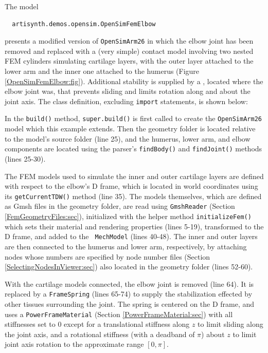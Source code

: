 The model 
\begin{verbatim}
  artisynth.demos.opensim.OpenSimFemElbow
\end{verbatim}
presents a modified version of {\tt OpenSimArm26} in which the elbow joint has
been removed and replaced with a (very simple) contact model involving two
nested FEM cylinders simulating cartilage layers, with the outer layer
attached to the lower arm and the inner one attached to the humerus (Figure
\ref{OpenSimFemElbow:fig}). Additional stability is supplied by a
, located where the elbow joint was, that
prevents sliding and limits rotation along and about the joint axis. The class
definition, excluding {\tt import} statements, is shown below:
%
\lstset{numbers=left} 
\iflatexml

\else

\fi
\lstset{numbers=none}
In the {\tt build()} method, {\tt super.build()} is first called to create the
{\tt OpenSimArm26} model which this example extends. Then the geometry folder is
located relative to the model's source folder (line 25), and the humerus, lower
arm, and elbow components are located using the parser's {\tt findBody()} and
{\tt findJoint()} methods (lines 25-30).

The FEM models used to simulate the inner and outer cartilage layers are
defined with respect to the elbow's D frame, which is located in world
coordinates using its {\tt getCurrentTDW()} method (line 35).  The models
themselves, which are defined as Gmsh files in the geometry folder, are read
using {\tt GmshReader} (Section \ref{FemGeometryFiles:sec}), initialized with
the helper method {\tt initializeFem()} which sets their material and rendering
properties (lines 5-19), transformed to the D frame, and added to the {\tt
MechModel} (lines 40-48). The inner and outer layers are then connected to the
humerus and lower arm, respectively, by attaching nodes whose numbers are
specified by node number files (Section \ref{SelectingNodesInViewer:sec})
also located in the geometry folder (lines 52-60).

With the cartilage models connected, the elbow joint is removed (line 64).  It
is replaced by a {\tt FrameSpring} (lines 65-74) to supply the stabilization
effected by other tissues surrounding the joint. The spring is centered on the
D frame, and uses a {\tt PowerFrameMaterial}
(Section \ref{PowerFrameMaterial:sec}) with all stiffnesses set to 0 except for
a translational stiffness along $z$ to limit sliding along the joint axis, and
a rotational stiffness (with a deadband of $\pi$) about $z$ to limit joint axis
rotation to the approximate range $[0, \pi]$.

